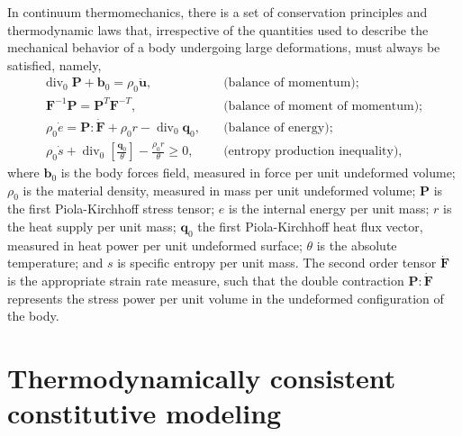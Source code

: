 In continuum thermomechanics, there is a set of conservation principles and thermodynamic laws that, irrespective of the quantities used to describe the mechanical behavior of a body undergoing large deformations, must always be satisfied, namely,
\begin{align}
  \text{div}_0\;\bm{P} + \bm{b}_0 = \rho_0 \ddot{\bm{u}},\quad & \text{(balance of momentum)};
                                                                 \label{eq:material_equilibrium}\\
  \bm{F}^{-1}\bm{P} = \bm{P}^{T}\bm{F} ^{-T},\quad & \text{(balance of moment of momentum)};\\
  \rho_0 \dot e = \bm{P} :\dot{\bm{F}} + \rho_0 r -\operatorname{div}_0 \bm{q}_0,\quad & \text{(balance of energy)};\label{eq:balance_energy}\\
  \rho_0 \dot s + \operatorname{div}_0 \left[\frac{\bm{q}_0}{\theta}\right] - \frac{\rho_0 r}{\theta} \geq 0,\quad & \text{(entropy production inequality)}\label{eq:entropy_production},
\end{align}
where $\bm{b}_0$ is the body forces field, measured in force per unit undeformed volume; $\rho_0$ is the material density, measured in mass per unit undeformed volume; \(\bm{P}\) is the first Piola-Kirchhoff stress tensor; \(e\) is the internal energy per unit mass; \(r\) is the heat supply per unit mass; \(\bm{q}_0\) the first Piola-Kirchhoff heat flux vector, measured in heat power per unit undeformed surface; $\theta$ is the absolute temperature; and $s$ is specific entropy per unit mass.
The second order tensor $\dot{\bm{F}}$ is the appropriate strain rate measure, such that the double contraction $\bm{P}:\dot{\bm{F}}$ represents the stress power per unit volume in the undeformed configuration of the body.

\section{Thermodynamically consistent constitutive modeling}

